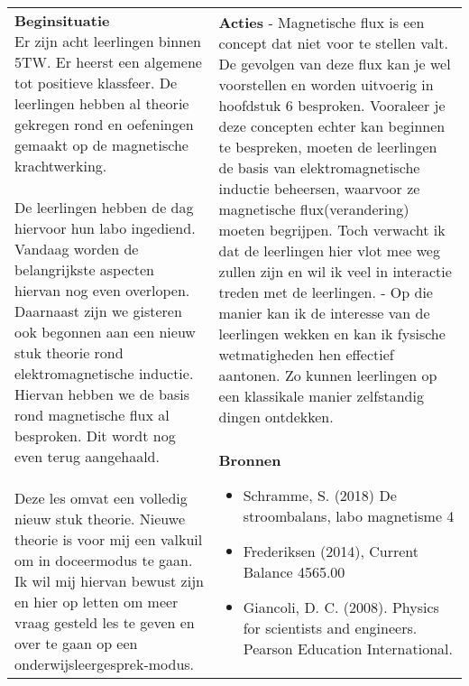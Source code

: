 \begin{landscape}
	\begin{tabularx}{1.56\textwidth}{|p{}|X|}
		\hline
		\multirow{2}{0.55\textwidth}{\textbf{Beginsituatie}\newline  
		Er zijn acht leerlingen binnen 5TW. Er heerst een algemene tot positieve klassfeer. De leerlingen hebben al theorie gekregen  rond en oefeningen gemaakt op de magnetische krachtwerking. \newline\newline De leerlingen hebben de dag hiervoor hun labo ingediend. Vandaag worden de belangrijkste aspecten hiervan nog even overlopen. Daarnaast zijn we gisteren ook begonnen aan een nieuw stuk theorie rond elektromagnetische inductie. Hiervan hebben we de basis rond magnetische flux al besproken. Dit wordt nog even terug aangehaald. \newline\newline Deze les omvat een volledig nieuw stuk theorie. Nieuwe theorie is voor mij een valkuil om in doceermodus te gaan. Ik wil mij hiervan bewust zijn en hier op letten om meer vraag gesteld les te geven en over te gaan op een onderwijsleergesprek-modus.} & \textbf{Acties}\newline\newline  
		- Magnetische flux is een concept dat niet voor te stellen valt. De gevolgen van deze flux kan je wel voorstellen en worden uitvoerig in hoofdstuk 6 besproken. Vooraleer je deze concepten echter kan beginnen te bespreken, moeten de leerlingen de basis van elektromagnetische inductie beheersen, waarvoor ze magnetische flux(verandering) moeten begrijpen. Toch verwacht ik dat de leerlingen hier vlot mee weg zullen zijn en wil ik veel in interactie treden met de leerlingen. \newline\newline
		- \GreenHighlight{Via demo's wil ik bepaalde onderwerpen starten.}{9cm}	Op die manier kan ik de interesse van de leerlingen wekken en kan ik fysische wetmatigheden hen effectief aantonen. Zo kunnen leerlingen op een klassikale manier zelfstandig dingen ontdekken.	
		\newline\newline\newline\newline\newline
		
		\\ \cline{2-2}
		  & \textbf{Bronnen}\begin{itemize}
		  	\item Schramme, S. (2018) De stroombalans, labo magnetisme 4
		  	\item Frederiksen (2014), Current Balance 4565.00
		  	\item Giancoli, D. C. (2008). Physics for scientists and engineers. Pearson Education International.
		  \end{itemize}\\ \hline
	\end{tabularx}



\end{landscape}
